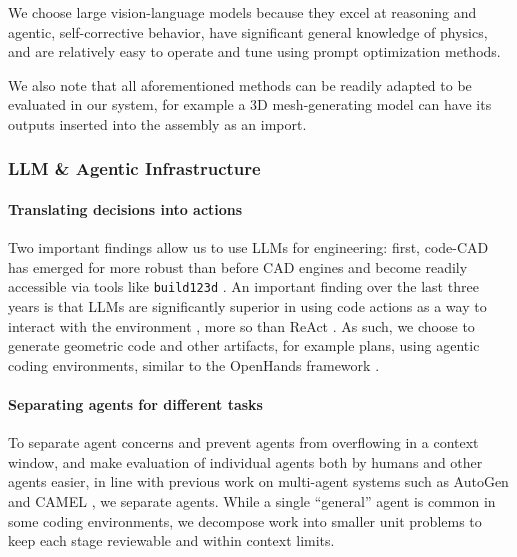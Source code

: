 \documentclass[conference]{IEEEtran}
\begin{document}
We choose large vision-language models because they excel at reasoning and agentic, self-corrective behavior, have significant general knowledge of physics, and are relatively easy to operate and tune using prompt optimization methods.

We also note that all aforementioned methods can be readily adapted to be evaluated in our system, for example a 3D mesh-generating model can have its outputs inserted into the assembly as an import.

\subsubsection{LLM \& Agentic Infrastructure}
\paragraph{Translating decisions into actions}
Two important findings allow us to use LLMs for engineering: first, code-CAD has emerged for more robust than before CAD engines and become readily accessible via tools like \texttt{build123d} \cite{ref4}. An important finding over the last three years is that LLMs are significantly superior in using code actions as a way to interact with the environment \cite{ref23}, more so than ReAct \cite{ref16}. As such, we choose to generate geometric code and other artifacts, for example plans, using agentic coding environments, similar to the OpenHands framework \cite{ref9}.

\paragraph{Separating agents for different tasks}
To separate agent concerns and prevent agents from overflowing in a context window, and make evaluation of individual agents both by humans and other agents easier, in line with previous work on multi-agent systems such as AutoGen \cite{ref24} and CAMEL \cite{ref25}, we separate agents. While a single ``general'' agent is common in some coding environments, we decompose work into smaller unit problems to keep each stage reviewable and within context limits.
\end{document}
